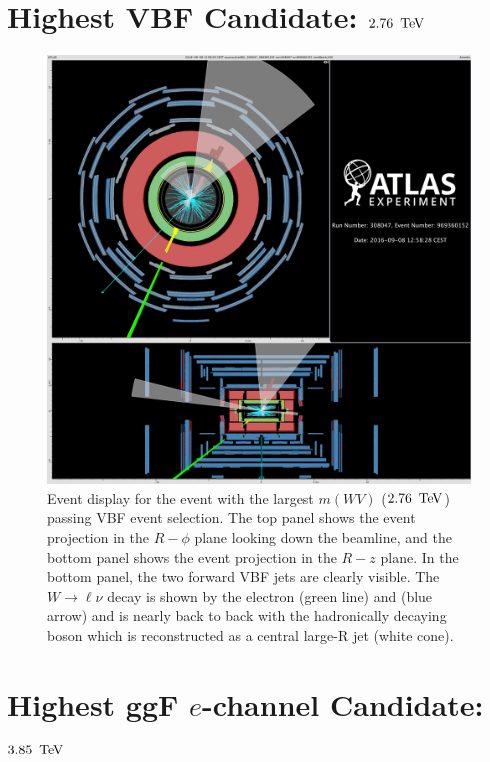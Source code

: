 \clearpage
\section{Highest VBF Candidate: $2.76\,\TeV$}
\label{sec:high_vbf}
\begin{figure}[h!tbp]
\begin{center}
\includegraphics[width=\linewidth]{figures/Appendix/highest_vbf_cand}
\caption[Event display for highest mass candidate (vector boson fusion selection)]{Event display for the event with the largest $m(WV)$ ($2.76\,\TeV$) passing VBF event selection. The top panel shows the event projection in the $R-\phi$ plane looking down the beamline, and the bottom panel shows the event projection in the $R-z$ plane.  In the bottom panel, the two forward VBF jets are clearly visible. The $W\rightarrow \ell\nu$ decay is shown by the electron (green line) and \MET (blue arrow) and is nearly back to back with the hadronically decaying boson which is reconstructed as a central large-R jet (white cone).}
\end{center}
\label{fig:vbf_ed}
\end{figure}

\clearpage
\section{Highest ggF $e$-channel Candidate: $3.85\,\TeV$}
\label{sec:high_ggf_e}

